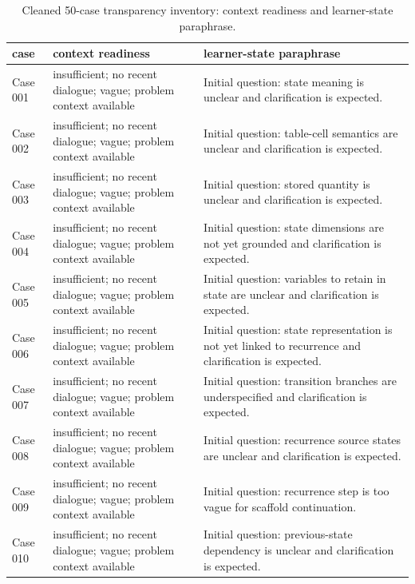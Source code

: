 \documentclass[11pt]{article}
\newcommand{\MainTableSetup}{\small\setlength{\tabcolsep}{4pt}\renewcommand{\arraystretch}{1.16}}
\begin{document}
\begin{landscape}
\begingroup
\MainTableSetup
\begin{xltabular}{\textwidth}{>{\raggedright\arraybackslash}p{0.08\textwidth}>{\raggedright\arraybackslash}p{0.34\textwidth}>{\raggedright\arraybackslash}X}
\caption{Cleaned 50-case transparency inventory: context readiness and learner-state paraphrase.}\label{tab:case-inventory-context}\\
\toprule
case & context readiness & learner-state paraphrase \\
\midrule
Case 001 & insufficient; no recent dialogue; vague; problem context available & Initial question: state meaning is unclear and clarification is expected. \\
Case 002 & insufficient; no recent dialogue; vague; problem context available & Initial question: table-cell semantics are unclear and clarification is expected. \\
Case 003 & insufficient; no recent dialogue; vague; problem context available & Initial question: stored quantity is unclear and clarification is expected. \\
Case 004 & insufficient; no recent dialogue; vague; problem context available & Initial question: state dimensions are not yet grounded and clarification is expected. \\
Case 005 & insufficient; no recent dialogue; vague; problem context available & Initial question: variables to retain in state are unclear and clarification is expected. \\
Case 006 & insufficient; no recent dialogue; vague; problem context available & Initial question: state representation is not yet linked to recurrence and clarification is expected. \\
Case 007 & insufficient; no recent dialogue; vague; problem context available & Initial question: transition branches are underspecified and clarification is expected. \\
Case 008 & insufficient; no recent dialogue; vague; problem context available & Initial question: recurrence source states are unclear and clarification is expected. \\
Case 009 & insufficient; no recent dialogue; vague; problem context available & Initial question: recurrence step is too vague for scaffold continuation. \\
Case 010 & insufficient; no recent dialogue; vague; problem context available & Initial question: previous-state dependency is unclear and clarification is expected. \\

\end{xltabular}
\end{landscape}
\end{document}
